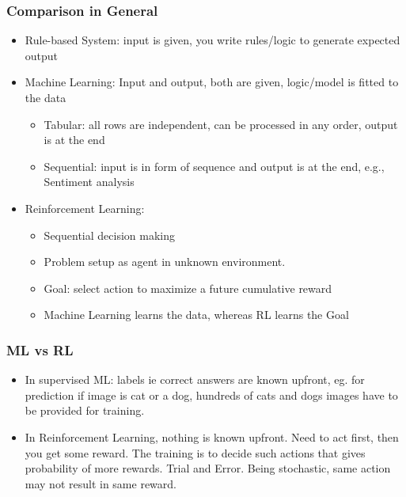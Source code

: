 \begin{frame}[fragile]\frametitle{Comparison in General}

\begin{itemize}
\item Rule-based System: input is given, you write rules/logic to generate expected output
\item Machine Learning: Input and output, both are given, logic/model is fitted to the data
	\begin{itemize}
	\item Tabular: all rows are independent, can be processed in any order, output is at the end
	\item Sequential: input is in form of sequence and output is at the end, e.g., Sentiment analysis
	\end{itemize}
\item Reinforcement Learning: 
	\begin{itemize}
	\item Sequential decision making 
	\item Problem setup as agent in unknown environment. 
	\item Goal: select action to maximize a future cumulative reward
	\item Machine Learning learns the data, whereas RL learns the Goal
	\end{itemize}
\end{itemize}

\end{frame}


\begin{frame}[fragile]\frametitle{ML vs RL}

\begin{itemize}
\item In supervised ML: labels ie correct answers are known upfront, eg. for prediction if image is cat or a dog, hundreds of cats and dogs images have to be provided for training.
\item In Reinforcement Learning,  nothing is known upfront. Need to act first, then you get some reward. The training is to decide such actions that gives probability of more rewards. Trial and Error. Being stochastic, same action may not result in same reward.
\end{itemize}
\end{frame}

